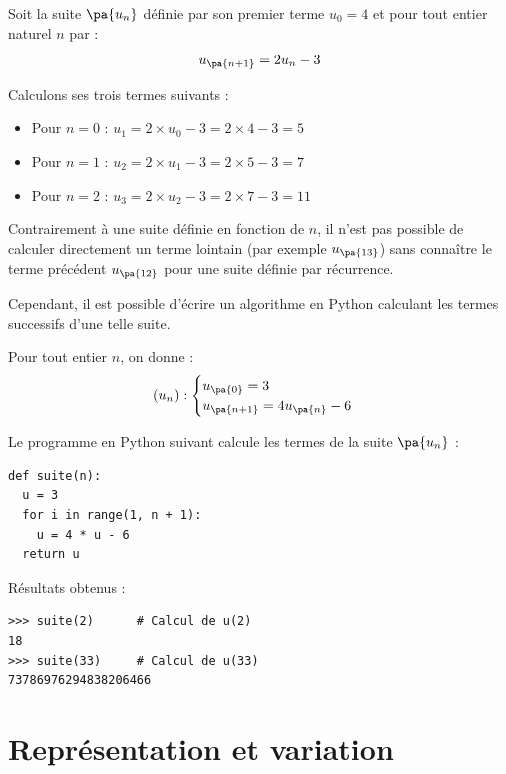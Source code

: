 \begin{ex}
	Soit la suite $\pa{u_n}$ définie par son premier terme $u_0 = 4$ et pour tout entier naturel $n$ par :
	\[
		u_{\pa{n+1}} = 2u_n - 3
	\]

	Calculons ses trois termes suivants :
	\begin{itemize}
		\item Pour $n=0$ : $u_1 = 2 \times u_0 - 3 = 2 \times 4 - 3 = 5$
		\item Pour $n=1$ : $u_2 = 2 \times u_1 - 3 = 2 \times 5 - 3 = 7$
		\item Pour $n=2$ : $u_3 = 2 \times u_2 - 3 = 2 \times 7 - 3 = 11$
	\end{itemize}
\end{ex}

\begin{remarque}
	Contrairement à une suite définie en fonction de $n$, il n'est pas possible de calculer directement un terme lointain (par exemple $u_{\pa{13}}$) sans connaître le terme précédent $u_{\pa{12}}$ pour une suite définie par récurrence.

	Cependant, il est possible d'écrire un algorithme en Python calculant les termes successifs d'une telle suite.
\end{remarque}

\begin{methode}
	Pour tout entier $n$, on donne :
	\[
		(u_{n}):\begin{cases}u_{\pa{0}}=3\\u_{\pa{n+1}}=4u_{\pa{n}} - 6\end{cases}
	\]

	Le programme en Python suivant calcule les termes de la suite $\pa{u_n}$ :
	\begin{lstlisting}
def suite(n):
  u = 3
  for i in range(1, n + 1):
    u = 4 * u - 6
  return u\end{lstlisting}

	\newpage

	Résultats obtenus :
	\begin{lstlisting}
>>> suite(2)      # Calcul de u(2)
18
>>> suite(33)     # Calcul de u(33)
73786976294838206466\end{lstlisting}
\end{methode}

\section{Représentation et variation}

